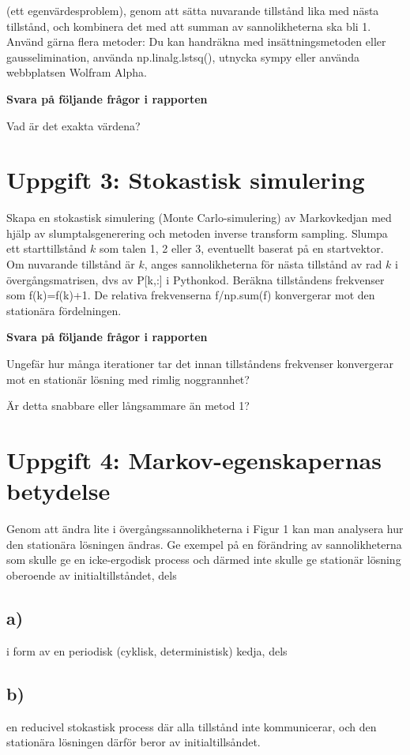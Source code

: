 \documentclass[a4paper]{article}
\begin{document}
(ett egenvärdesproblem), genom att sätta nuvarande tillstånd lika med nästa tillstånd, och
kombinera det med att summan av sannolikheterna ska bli 1. Använd gärna flera metoder: Du
kan handräkna med insättningsmetoden eller gausselimination,
använda np.linalg.lstsq(), utnycka sympy eller använda
webbplatsen Wolfram Alpha.

\textbf{Svara på följande frågor i rapporten}

Vad är det exakta värdena?


\section{Uppgift 3: Stokastisk simulering}
Skapa en stokastisk simulering (Monte Carlo-simulering) av Markovkedjan med hjälp av
slumptalsgenerering och metoden inverse transform sampling. Slumpa ett starttillstånd \( k \) som
talen 1, 2 eller 3, eventuellt baserat på en startvektor. Om nuvarande tillstånd är \( k \), anges
sannolikheterna för nästa tillstånd av rad \( k \) i övergångsmatrisen, dvs av P[k,:] i Pythonkod.
Beräkna tillståndens frekvenser som f(k)=f(k)+1. De relativa frekvenserna f/np.sum(f)
konvergerar mot den stationära fördelningen.


\textbf{Svara på följande frågor i rapporten}

Ungefär hur många iterationer tar det innan
tillståndens frekvenser konvergerar mot en stationär lösning med rimlig noggrannhet?

Är detta snabbare eller långsammare än metod 1?


\section{Uppgift 4: Markov-egenskapernas betydelse}
Genom att ändra lite i övergångssannolikheterna i Figur 1 kan man analysera hur den
stationära lösningen ändras. Ge exempel på en förändring av sannolikheterna som skulle ge
en icke-ergodisk process och därmed inte skulle ge stationär lösning oberoende av
initialtillståndet, dels

\subsection{a)}
i form av en periodisk (cyklisk, deterministisk) kedja, dels

\subsection{b)}
en reducivel stokastisk process där alla tillstånd inte kommunicerar, och den stationära
lösningen därför beror av initialtillsåndet.
\end{document}
